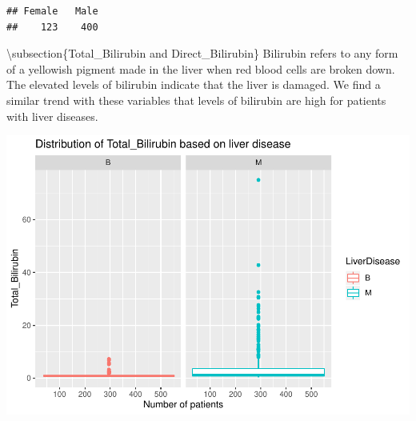 \documentclass[]{article}
\newenvironment{Shaded}{\begin{snugshade}}{\end{snugshade}}
\newcommand{\CommentTok}[1]{\textcolor[rgb]{0.56,0.35,0.01}{\textit{#1}}}
\newcommand{\DataTypeTok}[1]{\textcolor[rgb]{0.13,0.29,0.53}{#1}}
\newcommand{\KeywordTok}[1]{\textcolor[rgb]{0.13,0.29,0.53}{\textbf{#1}}}
\newcommand{\NormalTok}[1]{#1}
\newcommand{\OperatorTok}[1]{\textcolor[rgb]{0.81,0.36,0.00}{\textbf{#1}}}
\newcommand{\StringTok}[1]{\textcolor[rgb]{0.31,0.60,0.02}{#1}}
\begin{document}
\begin{Shaded}
\end{Shaded}

\begin{verbatim}
## Female   Male 
##    123    400
\end{verbatim}

\textbackslash subsection\{Total\_Bilirubin and Direct\_Bilirubin\}
Bilirubin refers to any form of a yellowish pigment made in the liver
when red blood cells are broken down. The elevated levels of bilirubin
indicate that the liver is damaged. We find a similar trend with these
variables that levels of bilirubin are high for patients with liver
diseases.

\begin{Shaded}
\end{Shaded}

\includegraphics{LiverDisease_files/figure-latex/unnamed-chunk-14-1.pdf}
\end{document}
